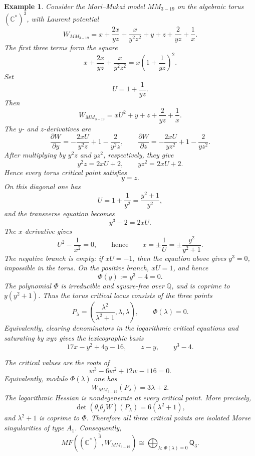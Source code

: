 \documentclass[11pt]{amsart}
\newtheorem{example}{Example}[section]
\newcommand{\MorseCat}[1]{\mathsf{Q}_{#1}}
\begin{document}
\begin{example}
Consider the Mori--Mukai model $MM_{3-19}$ on the algebraic torus
$(\mathbb{C}^*)^3$, with Laurent potential
\[
W_{MM_{3-19}}=x+\frac{2x}{yz}+\frac{x}{y^2z^2}+y+z
+\frac{2}{yz}+\frac{1}{x}.
\]
The first three terms form the square
\[
x+\frac{2x}{yz}+\frac{x}{y^2z^2}
=x\left(1+\frac{1}{yz}\right)^2.
\]
Set
\[
U=1+\frac{1}{yz}.
\]
Then
\[
W_{MM_{3-19}}=xU^2+y+z+\frac{2}{yz}+\frac{1}{x}.
\]
The $y$- and $z$-derivatives are
\[
\frac{\partial W}{\partial y}
=-\frac{2xU}{y^2z}+1-\frac{2}{y^2z},
\qquad
\frac{\partial W}{\partial z}
=-\frac{2xU}{yz^2}+1-\frac{2}{yz^2}.
\]
After multiplying by $y^2z$ and $yz^2$, respectively, they give
\[
y^2z=2xU+2,
\qquad
yz^2=2xU+2.
\]
Hence every torus critical point satisfies
\[
y=z.
\]
On this diagonal one has
\[
U=1+\frac{1}{y^2}=\frac{y^2+1}{y^2},
\]
and the transverse equation becomes
\[
y^3-2=2xU.
\]
The $x$-derivative gives
\[
U^2-\frac{1}{x^2}=0,
\qquad\text{hence}\qquad
x=\pm\frac{1}{U}=\pm\frac{y^2}{y^2+1}.
\]
The negative branch is empty: if $xU=-1$, then the equation above gives
$y^3=0$, impossible in the torus. On the positive branch, $xU=1$, and hence
\[
\Phi(y):=y^3-4=0.
\]
The polynomial $\Phi$ is irreducible and square-free over $\mathbb{Q}$, and is
coprime to $y(y^2+1)$. Thus the torus critical locus consists of the three
points
\[
P_\lambda=\left(\frac{\lambda^2}{\lambda^2+1},\lambda,\lambda\right),
\qquad
\Phi(\lambda)=0.
\]
Equivalently, clearing denominators in the logarithmic critical equations and
saturating by $xyz$ gives the lexicographic basis
\[
17x-y^2+4y-16,
\qquad
z-y,
\qquad
y^3-4.
\]

The critical values are the roots of
\[
w^3-6w^2+12w-116=0.
\]
Equivalently, modulo $\Phi(\lambda)$ one has
\[
W_{MM_{3-19}}(P_\lambda)=3\lambda+2.
\]
The logarithmic Hessian is nondegenerate at every critical point. More
precisely,
\[
\det(\theta_i\theta_jW)(P_\lambda)=6(\lambda^2+1),
\]
and $\lambda^2+1$ is coprime to $\Phi$. Therefore all three critical points are
isolated Morse singularities of type $A_1$. Consequently,
\[
\overline{MF((\mathbb{C}^*)^3,W_{MM_{3-19}})}
\cong \bigoplus_{\lambda:\,\Phi(\lambda)=0}\MorseCat{3}.
\]
\end{example}
\end{document}
